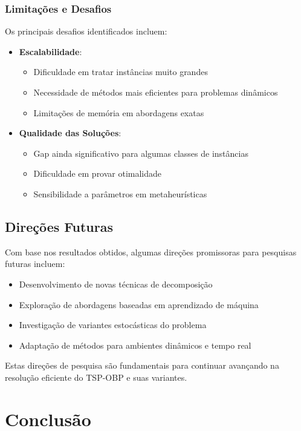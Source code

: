 \documentclass[12pt, a4paper]{report}
\begin{document}
\subsection{Limitações e Desafios}
Os principais desafios identificados incluem:

\begin{itemize}
    \item \textbf{Escalabilidade}:
    \begin{itemize}
        \item Dificuldade em tratar instâncias muito grandes
        \item Necessidade de métodos mais eficientes para problemas dinâmicos
        \item Limitações de memória em abordagens exatas
    \end{itemize}
    
    \item \textbf{Qualidade das Soluções}:
    \begin{itemize}
        \item Gap ainda significativo para algumas classes de instâncias
        \item Dificuldade em provar otimalidade
        \item Sensibilidade a parâmetros em metaheurísticas
    \end{itemize}
\end{itemize}

\section{Direções Futuras}
Com base nos resultados obtidos, algumas direções promissoras para pesquisas futuras incluem:

\begin{itemize}
    \item Desenvolvimento de novas técnicas de decomposição
    \item Exploração de abordagens baseadas em aprendizado de máquina
    \item Investigação de variantes estocásticas do problema
    \item Adaptação de métodos para ambientes dinâmicos e tempo real
\end{itemize}

Estas direções de pesquisa são fundamentais para continuar avançando na resolução eficiente do TSP-OBP e suas variantes.

\chapter{Conclusão}
\end{document}
